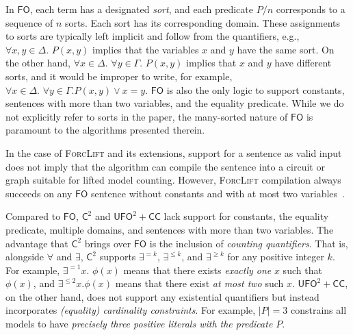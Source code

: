 \documentclass[a4paper,UKenglish,cleveref, autoref, thm-restate]{lipics-v2021}
\newcommand{\Ctwo}{$\mathsf{C}^{2}$}
\newcommand{\FO}{$\mathsf{FO}$}
\newcommand{\UFO}{$\mathsf{UFO}^{2} + \mathsf{CC}$}
\begin{document}
In \FO{}, each term has a designated \emph{sort}, and each predicate $P/n$
corresponds to a sequence of $n$ sorts. Each sort has its corresponding domain.
These assignments to sorts are typically left implicit and follow from the
quantifiers, e.g., $\forall x,y \in \Delta\text{. }P(x, y)$ implies that the
variables $x$ and $y$ have the same sort. On the other hand,
$\forall x \in \Delta\text{. }\forall y \in \Gamma\text{. } P(x, y)$ implies
that $x$ and $y$ have different sorts, and it would be improper to write, for
example, $\forall x \in \Delta\text{. }\forall y \in \Gamma\text{.
} P(x, y) \lor x = y$. \FO{} is also the only logic to support constants,
sentences with more than two variables, and the equality predicate. While we do
not explicitly refer to sorts in the paper, the many-sorted nature of \FO{} is
paramount to the algorithms presented therein.

\begin{remark*}
  In the case of \textsc{ForcLift} and its extensions, support for a sentence as
  valid input does not imply that the algorithm can compile the sentence into a
  circuit or graph suitable for lifted model counting. However,
  \textsc{ForcLift} compilation always succeeds on any \FO{} sentence without
  constants and with at most two
  variables~\cite{DBLP:conf/nips/Broeck11,DBLP:conf/kr/BroeckMD14}.
\end{remark*}

Compared to \FO{}, \Ctwo{} and \UFO{} lack support for constants, the equality
predicate, multiple domains, and sentences with more than two variables. The
advantage that \Ctwo{} brings over \FO{} is the inclusion of \emph{counting
  quantifiers}. That is, alongside $\forall$ and $\exists$, \Ctwo{} supports
$\exists^{=k}$, $\exists^{\le k}$, and $\exists^{\ge k}$ for any positive
integer $k$. For example, $\exists^{=1} x\text{. }\phi(x)$ means that there
exists \emph{exactly one} $x$ such that $\phi(x)$, and $\exists^{\le 2} x\text{.
}\phi(x)$ means that there exist \emph{at most two} such $x$. \UFO{}, on the
other hand, does not support any existential quantifiers but instead
incorporates \emph{(equality) cardinality constraints}. For example, $|P| = 3$
constrains all models to have \emph{precisely three positive literals with the
  predicate $P$}.
\end{document}
